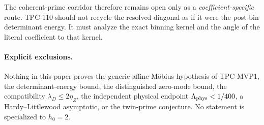 \documentclass[11pt,a4paper]{article}
\theoremstyle{definition}
\theoremstyle{remark}
\begin{document}
The coherent-prime corridor therefore remains open only as a
\emph{coefficient-specific} route.  TPC-110 should not recycle the
resolved diagonal as if it were the post-bin determinant energy.  It
must analyze the exact binning kernel and the angle of the literal
coefficient to that kernel.

\paragraph{Explicit exclusions.}
Nothing in this paper proves the generic affine M\"obius hypothesis
of TPC-MVP1, the determinant-energy bound, the distinguished
zero-mode bound, the compatibility
\(\lambda_D\le2\eta_Z\), the independent physical endpoint
\(\Lambda_{\rm phys}<1/400\), a Hardy--Littlewood asymptotic, or the
twin-prime conjecture.  No statement is specialized to \(h_0=2\).

\begingroup
\sloppy


\endgroup
\end{document}
